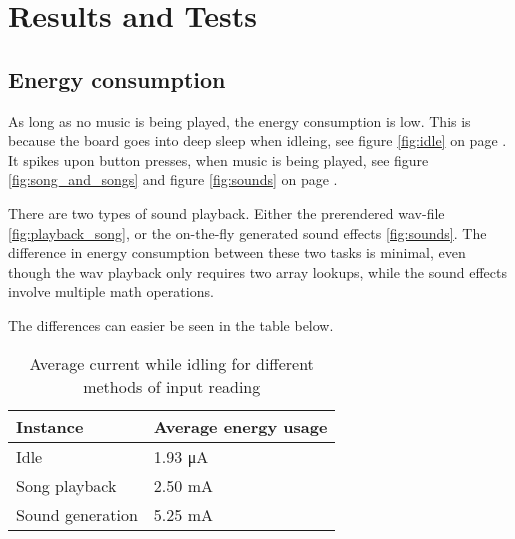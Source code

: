 \section{Results and Tests}

\subsection{Energy consumption}

As long as no music is being played, the energy consumption is low. This is because the board goes into deep sleep when idleing, see figure \ref{fig:idle} on page \pageref{fig:idle}.
It spikes upon button presses, when music is being played, see figure \ref{fig:song_and_songs} and figure \ref{fig:sounds} on page \pageref{fig:song_and_songs}.

There are two types of sound playback.
Either the prerendered wav-file \ref{fig:playback_song}, or the on-the-fly generated sound effects \ref{fig:sounds}.
The difference in energy consumption between these two tasks is minimal, even though the wav playback only requires two array lookups, while the sound effects involve multiple math operations.

The differences can easier be seen in the table below.

\begin{table}[ht!]
    \begin{center}
    \begin{tabular}{ | l | l | }
        \hline
        Instance            & Average energy usage \\
        \hline
        Idle                & 1.93 \si{\micro\ampere} \\
        \hline
        Song playback       & 2.50 \si{\milli\ampere} \\
        \hline
        Sound generation    & 5.25 \si{\milli\ampere} \\
        \hline
    \end{tabular}
    \caption{Average current while idling for different methods of input reading}
    \label{tab:energy_usage}
    \end{center}
\end{table}

